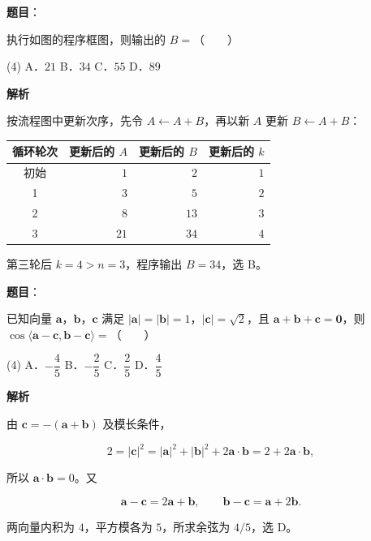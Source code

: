 \begin{answer}

\textbf{题目}：

执行如图的程序框图，则输出的 $B=$\mbox{（　　）}
\nopagebreak[4]
\begin{center}\end{center}
\nopagebreak[4]
\begin{gkopts}(4)
\task A．$21$
\task B．$34$
\task C．$55$
\task D．$89$
\end{gkopts}

\textbf{解析}

按流程图中更新次序，先令 $A\leftarrow A+B$，再以新 $A$ 更新 $B\leftarrow A+B$：

\begin{center}
\begin{tabular}{crrr}
\toprule
循环轮次 & 更新后的 $A$ & 更新后的 $B$ & 更新后的 $k$ \\
\midrule
初始 & $1$ & $2$ & $1$ \\
1 & $3$ & $5$ & $2$ \\
2 & $8$ & $13$ & $3$ \\
3 & $21$ & $34$ & $4$ \\
\bottomrule
\end{tabular}
\end{center}

第三轮后 $k=4>n=3$，程序输出 $B=34$，选 B。


\end{answer}
\begin{answer}

\textbf{题目}：

已知向量 $\boldsymbol a$，$\boldsymbol b$，$\boldsymbol c$ 满足 $|\boldsymbol a|=|\boldsymbol b|=1$，$|\boldsymbol c|=\sqrt2$，且 $\boldsymbol a+\boldsymbol b+\boldsymbol c=\boldsymbol0$，则 $\cos\langle\boldsymbol a-\boldsymbol c,\boldsymbol b-\boldsymbol c\rangle=$\mbox{（　　）}

\begin{gkopts}(4)
\task A．$-\dfrac45$
\task B．$-\dfrac25$
\task C．$\dfrac25$
\task D．$\dfrac45$
\end{gkopts}

\textbf{解析}

由 $\boldsymbol c=-(\boldsymbol a+\boldsymbol b)$ 及模长条件，

\nopagebreak[4]
\[
2=|\boldsymbol c|^2=|\boldsymbol a|^2+|\boldsymbol b|^2+2\boldsymbol a\cdot\boldsymbol b
=2+2\boldsymbol a\cdot\boldsymbol b,
\]

所以 $\boldsymbol a\cdot\boldsymbol b=0$。又

\nopagebreak[4]
\[
\boldsymbol a-\boldsymbol c=2\boldsymbol a+\boldsymbol b,\qquad
\boldsymbol b-\boldsymbol c=\boldsymbol a+2\boldsymbol b.
\]

两向量内积为 $4$，平方模各为 $5$，所求余弦为 $4/5$，选 D。


\end{answer}
